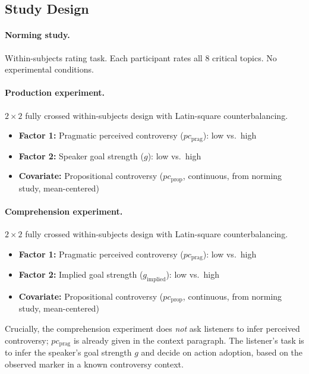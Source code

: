 \documentclass[12pt]{article}
\begin{document}
\subsection{Study Design}
\label{sec:study-design}

\paragraph{Norming study.} Within-subjects rating task. Each participant rates all 8 critical topics. No experimental conditions.

\paragraph{Production experiment.} $2 \times 2$ fully crossed within-subjects design with Latin-square counterbalancing.
\begin{itemize}
    \item \textbf{Factor 1:} Pragmatic perceived controversy ($pc_{\text{prag}}$): low vs.\ high
    \item \textbf{Factor 2:} Speaker goal strength ($g$): low vs.\ high
    \item \textbf{Covariate:} Propositional controversy ($pc_{\text{prop}}$, continuous, from norming study, mean-centered)
\end{itemize}

\paragraph{Comprehension experiment.} $2 \times 2$ fully crossed within-subjects design with Latin-square counterbalancing.
\begin{itemize}
    \item \textbf{Factor 1:} Pragmatic perceived controversy ($pc_{\text{prag}}$): low vs.\ high
    \item \textbf{Factor 2:} Implied goal strength ($g_{\text{implied}}$): low vs.\ high
    \item \textbf{Covariate:} Propositional controversy ($pc_{\text{prop}}$, continuous, from norming study, mean-centered)
\end{itemize}

Crucially, the comprehension experiment does \emph{not} ask listeners to infer perceived controversy; $pc_{\text{prag}}$ is already given in the context paragraph. The listener's task is to infer the speaker's goal strength $g$ and decide on action adoption, based on the observed marker in a known controversy context.
\end{document}

